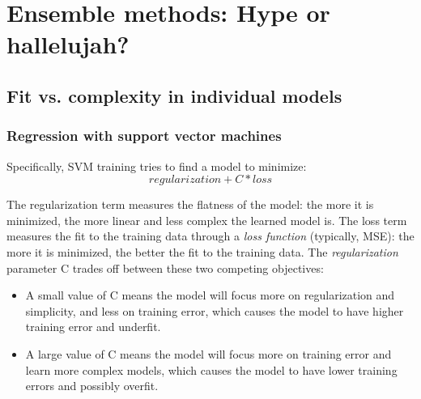 \chapter{Ensemble methods: Hype or hallelujah?}
\section{Fit vs. complexity in individual models}
\subsection*{Regression with support vector machines}
Specifically, SVM training tries to find a model to
minimize:
\begin{equation}
    regularization+C*loss
\end{equation}

The regularization term measures the flatness of the model: the more it is minimized,
the more linear and less complex the learned model is. The loss term measures the fit
to the training data through a \textit{loss function} (typically, MSE): the more it is minimized,
the better the fit to the training data. The \textit{regularization} parameter C trades off
between these two competing objectives:
\begin{itemize}
    \item A small value of C means the model will focus more on regularization and simplicity, and less on training error, which causes the model to have higher training error and underfit.
    \item A large value of C means the model will focus more on training error and learn more complex models, which causes the model to have lower training errors and possibly overfit.
\end{itemize}

